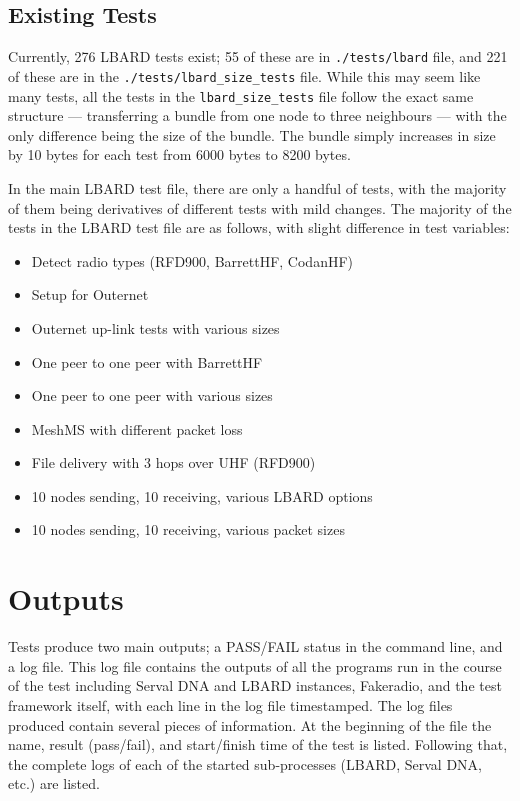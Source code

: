 \subsection{Existing Tests}
Currently, 276 LBARD tests exist; 55 of these are in \texttt{./tests/lbard} file, and 221 of these are in the \texttt{./tests/lbard\_size\_tests} file.
While this may seem like many tests, all the tests in the \texttt{lbard\_size\_tests} file follow the exact same structure — transferring a bundle from one node to three neighbours — with the only difference being the size of the bundle.
The bundle simply increases in size by 10 bytes for each test from 6000 bytes to 8200 bytes.

In the main LBARD test file, there are only a handful of tests, with the majority of them being derivatives of different tests with mild changes. 
The majority of the tests in the LBARD test file are as follows, with slight difference in test variables:
\begin{itemize}
    \item Detect radio types (RFD900, BarrettHF, CodanHF)
    \item Setup for Outernet
    \item Outernet up-link tests with various sizes
    \item One peer to one peer with BarrettHF
    \item One peer to one peer with various sizes
    \item MeshMS with different packet loss
    \item File delivery with 3 hops over UHF (RFD900)
    \item 10 nodes sending, 10 receiving, various LBARD options
    \item 10 nodes sending, 10 receiving, various packet sizes
\end{itemize}




\section{Outputs}
Tests produce two main outputs; a PASS/FAIL status in the command line, and a log file.
This log file contains the outputs of all the programs run in the course of the test including Serval DNA and LBARD instances, Fakeradio, and the test framework itself, with each line in the log file timestamped.
The log files produced contain several pieces of information.
At the beginning of the file the name, result (pass/fail), and start/finish time of the test is listed.
Following that, the complete logs of each of the started sub-processes (LBARD, Serval DNA, etc.) are listed.

